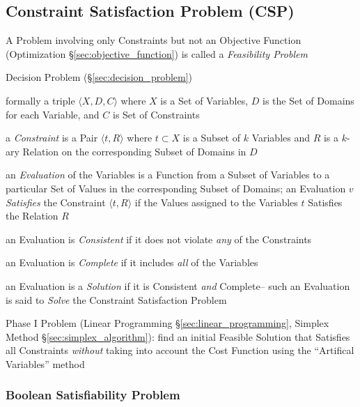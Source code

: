 \subsection{Constraint Satisfaction Problem (CSP)}
\label{sec:constraint_satisfaction}


A Problem involving only Constraints but not an Objective Function
(Optimization \S\ref{sec:objective_function}) is called a \emph{Feasibility
  Problem}

\fist Decision Problem (\S\ref{sec:decision_problem})

formally a triple $\langle{X,D,C}\rangle$ where $X$ is a Set of Variables, $D$
is the Set of Domains for each Variable, and $C$ is Set of Constraints

a \emph{Constraint} is a Pair $\langle{t,R}\rangle$ where $t \subset X$ is a
Subset of $k$ Variables and $R$ is a $k$-ary Relation on the corresponding
Subset of Domains in $D$

an \emph{Evaluation} of the Variables is a Function from a Subset of Variables
to a particular Set of Values in the corresponding Subset of Domains; an
Evaluation $v$ \emph{Satisfies} the Constraint $\langle{t,R}\rangle$ if the
Values assigned to the Variables $t$ Satisfies the Relation $R$

an Evaluation is \emph{Consistent} if it does not violate \emph{any} of the
Constraints

an Evaluation is \emph{Complete} if it includes \emph{all} of the Variables

an Evaluation is a \emph{Solution} if it is Consistent \emph{and} Complete--
such an Evaluation is said to \emph{Solve} the Constraint Satisfaction Problem

\fist Phase I Problem (Linear Programming \S\ref{sec:linear_programming},
Simplex Method \S\ref{sec:simplex_algorithm}): find an initial Feasible
Solution that Satisfies all Constraints \emph{without} taking into account the
Cost Function using the ``Artifical Variables'' method



\subsubsection{Boolean Satisfiability Problem}\label{sec:sat}

